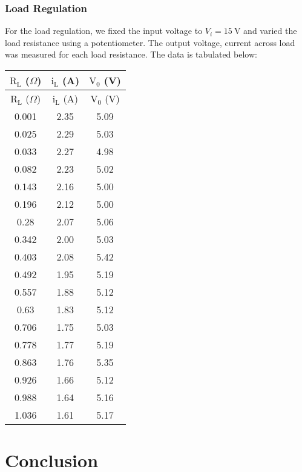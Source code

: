 \documentclass[12pt]{article}
\begin{document}
\subsubsection{Load Regulation}
For the load regulation, we fixed the input voltage to $V_i = 15 \ \mathrm{V}$ and varied the load resistance using a potentiometer. The output voltage, current across load was measured for each load resistance. The data is tabulated below:
\begin{longtable}{|c|c|c|}
        \hline
        $\text{R}_\text{L}$ ($\Omega$) & $\text{i}_\text{L}$ (A) & $\text{V}_0$ (V) \\ \hline \hline
        \endfirsthead
        
        \hline
        $\text{R}_\text{L}$ ($\Omega$) & $\text{i}_\text{L}$ (A) & $\text{V}_0$ (V) \\ \hline
        \endhead
        
        \hline
        \endfoot
        
        \hline
        \endlastfoot
        
        0.001      & 2.35      & 5.09 \\ \hline
        0.025      & 2.29      & 5.03 \\ \hline
        0.033      & 2.27      & 4.98 \\ \hline
        0.082      & 2.23      & 5.02 \\ \hline
        0.143      & 2.16      & 5.00 \\ \hline
        0.196      & 2.12      & 5.00 \\ \hline
        0.28       & 2.07      & 5.06 \\ \hline
        0.342      & 2.00      & 5.03 \\ \hline
        0.403      & 2.08      & 5.42 \\ \hline
        0.492      & 1.95      & 5.19 \\ \hline
        0.557      & 1.88      & 5.12 \\ \hline
        0.63       & 1.83      & 5.12 \\ \hline
        0.706      & 1.75      & 5.03 \\ \hline
        0.778      & 1.77      & 5.19 \\ \hline
        0.863      & 1.76      & 5.35 \\ \hline
        0.926      & 1.66      & 5.12 \\ \hline
        0.988      & 1.64      & 5.16 \\ \hline
        1.036      & 1.61      & 5.17 \\ \hline
        
\end{longtable}

        
\section{Conclusion}
\end{document}
